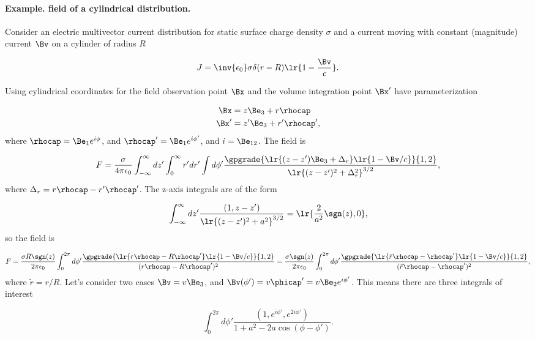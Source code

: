 %
%

\paragraph{Example.  field of a cylindrical distribution.}

Consider an electric multivector current distribution for static surface charge density \( \sigma \) and a current moving with constant (magnitude) current \( \Bv \) on a cylinder of radius \( R \)

\begin{dmath}\label{eqn:cylinderField:20}
J = \inv{\epsilon_0} \sigma \delta( r - R ) \lr{ 1 - \frac{\Bv}{c} }.
\end{dmath}

Using cylindrical coordinates for the field observation point \( \Bx \) and the volume integration point \( \Bx' \) have parameterization

\begin{dmath}\label{eqn:cylinderField:40}
\begin{aligned}
\Bx &= z \Be_3 + r \rhocap \\
\Bx' &= z' \Be_3 + r' \rhocap',
\end{aligned}
\end{dmath}
where \( \rhocap = \Be_1 e^{i \phi} \), and \( \rhocap' = \Be_1 e^{i \phi'} \), and \( i = \Be_{12} \).
The field is

\begin{dmath}\label{eqn:cylinderField:60}
F = \frac{\sigma}{4 \pi \epsilon_0}
\int_{-\infty}^\infty dz' \int_0^\infty r' dr' \int d\phi' \frac{
   \gpgrade{ \lr{ (z-z') \Be_3 + \Delta_r }\lr{ 1 - \Bv/c }  }{1,2}
}{ \lr{ (z -z')^2 + \Delta_r^2 }^{3/2} },
\end{dmath}
where \( \Delta_r = r \rhocap - r' \rhocap' \).
The z-axis integrals are of the form

\begin{dmath}\label{eqn:cylinderField:80}
\int_{-\infty}^\infty dz' \frac{ (1, z-z') }{ \lr{(z-z')^2 + a^2 }^{3/2}}
=
\lr{ \frac{2}{a^2} \sgn(z), 0 },
\end{dmath}
so the field is

\begin{dmath}\label{eqn:cylinderField:100}
F
=
\frac{\sigma R \sgn(z)}{2 \pi \epsilon_0}
\int_0^{2 \pi} d\phi' \frac{
   \gpgrade{ \lr{ r\rhocap - R \rhocap' } \lr{ 1 - \Bv/c } }{1,2}
}
{ (r\rhocap - R \rhocap')^2 }
=
\frac{\sigma \sgn(z)}{2 \pi \epsilon_0}
\int_0^{2 \pi} d\phi' \frac{
   \gpgrade{ \lr{ \tilde{r}\rhocap - \rhocap' } \lr{ 1 - \Bv/c } }{1,2}
}
{ (\tilde{r}\rhocap - \rhocap')^2 },
\end{dmath}
where \( \tilde{r} = r/R \).
Let's consider two cases \( \Bv = v \Be_3 \), and \( \Bv(\phi') = v \phicap' = v \Be_2 e^{i\phi'} \).  This means there are three integrals of interest

\begin{dmath}\label{eqn:cylinderField:120}
\int_0^{2 \pi} d\phi' \frac{(1, e^{i\phi'}, e^{2 i\phi'})}{1 + a^2 - 2 a \cos(\phi-\phi')}.
\end{dmath}
